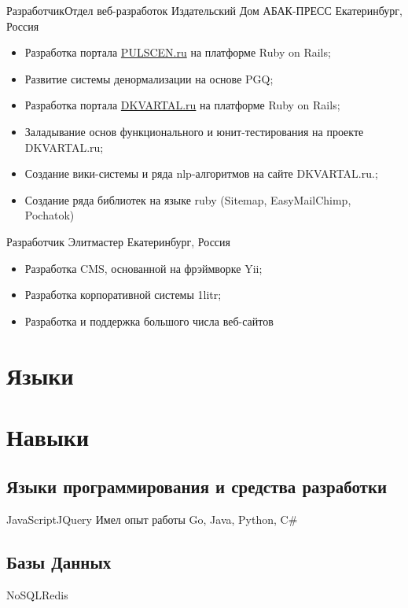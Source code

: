 \documentclass[11pt,a4paper]{moderncv}
\begin{document}
  {Разработчик}{Отдел веб-разработок}
  {Издательский Дом АБАК-ПРЕСС}
  {Екатеринбург, Россия}
{
\begin{itemize}
  \item Разработка портала \href{http://pulscen.ru}{PULSCEN.ru} на платформе Ruby on Rails;
  \item Развитие системы денормализации на основе PGQ;
  \item Разработка портала \href{http://dkvartal.ru}{DKVARTAL.ru} на платформе Ruby on Rails;
  \item Заладывание основ функционального и юнит-тестирования на проекте {DKVARTAL.ru};
  \item Создание вики-системы и ряда nlp-алгоритмов на сайте {DKVARTAL.ru}.;
  \item Создание ряда библиотек на языке ruby (Sitemap, EasyMailChimp, Pochatok)
\end{itemize}
}

\cvitem {}{}

  {Разработчик}{}
  {Элитмастер}
  {Екатеринбург, Россия}
{
\begin{itemize}
  \item Разработка CMS, основанной на фрэймворке Yii;
  \item Разработка корпоративной системы {1litr};
  \item Разработка и поддержка большого числа веб-сайтов
\end{itemize}
}


\section{Языки}

\section{Навыки}
\subsection{Языки программирования и средства разработки}
{JavaScript}{JQuery}
\cvcomputer
{Имел опыт работы} {Go, Java, Python, C\#}
{}{}
\subsection{Базы Данных}
           {NoSQL}{Redis}
\end{document}
